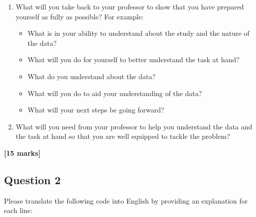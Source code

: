 \documentclass[
  10t,
]{article}
\providecommand{\tightlist}{%
  \setlength{\itemsep}{0pt}\setlength{\parskip}{0pt}}\usepackage{longtable,booktabs,array}
\begin{document}
\begin{enumerate}
\def\labelenumi{\alph{enumi}.}
\tightlist
\item
  What will you take back to your professor to show that you have
  prepared yourself as fully as possible? For example:

  \begin{itemize}
  \tightlist
  \item
    What is in your ability to understand about the study and the nature
    of the data?
  \item
    What will you do for yourself to better understand the task at hand?
  \item
    What do you understand about the data?
  \item
    What will you do to aid your understanding of the data?
  \item
    What will your next steps be going forward?
  \end{itemize}
\item
  What will you need from your professor to help you understand the data
  and the task at hand so that you are well equipped to tackle the
  problem?
\end{enumerate}

\textbf{{[}15 marks{]}}

\subsection{Question 2}\label{question-2}

Please translate the following code into English by providing an
explanation for each line:
\end{document}
